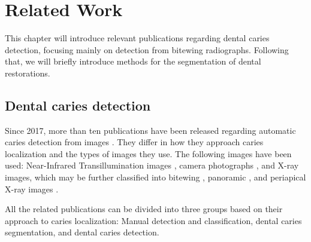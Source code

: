 \chapter{Related Work}
\label{chapter:related_work}
This chapter will introduce relevant publications regarding dental caries detection, focusing mainly on detection from bitewing radiographs. Following that, we will briefly introduce methods for the segmentation of dental restorations.

\section{Dental caries detection}
Since 2017, more than ten publications have been released regarding automatic caries detection from images \cite{PradosPrivado2020}. They differ in how they approach caries localization and the types of images they use. The following images have been used: Near-Infrared Transillumination images \cite{Casalegno2019,Schwendicke2020}, camera photographs \cite{Moutselos2019}, and X-ray images, which may be further classified into bitewing \cite{Moran2021, Cantu2020, Bayrakdar2021, Mao2021, Srivastava2017}, panoramic \cite{Lian2021}, and periapical X-ray images \cite{Lee2018}.

All the related publications can be divided into three groups based on their approach to caries localization: Manual detection and classification, dental caries segmentation, and dental caries detection.

